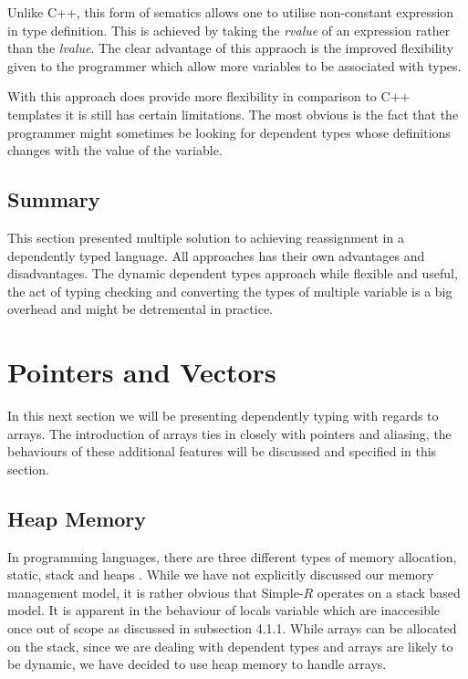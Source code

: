 \documentclass[a4paper,12pt]{report}
\begin{document}
\par
Unlike C++, this form of sematics allows one to utilise non-constant expression 
in type definition. This is achieved by taking the \textit{rvalue} \cite{cpplrvalues} 
of an expression rather than the \textit{lvalue}. The clear advantage of this 
appraoch is the improved flexibility given to the programmer which allow more 
variables to be associated with types. 

\par
With this approach does provide more flexibility in comparison to 
C++ templates it is still has certain limitations. The most obvious is the fact 
that the programmer might sometimes be looking for dependent types 
whose definitions changes with the value of the variable. 

\subsection{Summary}
This section presented multiple solution to achieving reassignment in a 
dependently typed language. All approaches has their own advantages and 
disadvantages. The dynamic dependent types approach while flexible and useful, 
the act of typing checking and converting the types of multiple variable is a 
big overhead and might be detremental in practice. 

\section{Pointers and Vectors}
In this next section we will be presenting dependently typing with regards to 
arrays. The introduction of arrays ties in closely with pointers and aliasing, 
the behaviours of these additional features will be discussed and specified in this 
section.

\subsection{Heap Memory}
In programming languages, there are three different types of memory allocation, 
static, stack and heaps \cite{heapVsStack}. While we have not explicitly 
discussed our memory management model, it is rather obvious that Simple-$R$ 
operates on a stack based model. It is apparent in the behaviour of locals 
variable which are inaccesible once out of scope as discussed in subsection 
4.1.1. While arrays can be allocated on the stack, since we are dealing 
with dependent types and arrays are likely to be dynamic, we have decided to use heap 
memory to handle arrays. 
\end{document}
